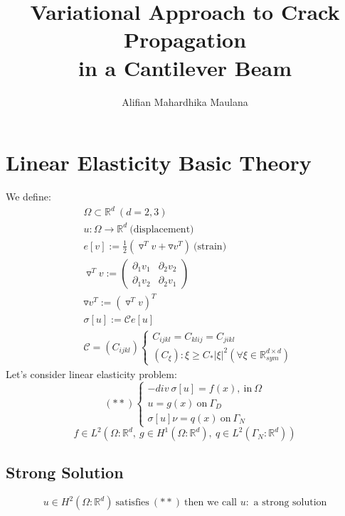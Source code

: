 \documentclass[a4paper,11pt]{article}
\title{Variational Approach to Crack Propagation\\ in a Cantilever Beam}
\author{Alifian Mahardhika Maulana}
\newcommand{\R}{\mathbb{R}}
\newcommand{\Cmod}{\mathcal{C}}
\begin{document}
\maketitle
\section{Linear Elasticity Basic Theory}
We define:
\begin{equation*}
\begin{aligned}
&\Omega \subset \R^d\ (d=2,3)\\
&u:\Omega \rightarrow \R^d\ \text{(displacement)}\\
&e[v]:= \frac{1}{2}(\triangledown^T v + \triangledown v^T)\ \text{(strain)}\\
&\triangledown^T v := \begin{pmatrix}
\partial_1 v_1 & \partial_2 v_2\\
\partial_1 v_2 & \partial_2 v_1
\end{pmatrix}\\
& \triangledown v^T := ( \triangledown^T v)^T\\
&\sigma[u]:=\Cmod e[u]\\
&\Cmod=(C_{ijkl})\begin{cases}
C_{ijkl}=C_{klij}=C_{jikl}\\
(C_\xi):\xi \geq C_* |\xi|^2 (\forall \xi \in \R_{sym}^{d\times d})
\end{cases}
\end{aligned}
\end{equation*}
Let's consider linear elasticity problem:
\begin{equation}\label{eq:stronglinear}
(**)\begin{cases}
-div\ \sigma[u]=f(x),\ \text{in}\ \Omega\\
u=g(x)\ \text{on}\ \Gamma_D\\
\sigma[u] \nu = q(x)\ \text{on}\ \Gamma_N
\end{cases}
\end{equation}
\begin{equation*}
f \in L^2(\Omega : \R^d,\ g\in H^1(\Omega : \R^d),\ q\in L^2(\Gamma_N:\R^d))
\end{equation*}
\subsection{Strong Solution}
\begin{equation}
u\in H^2 (\Omega : \R^d)\ \text{satisfies}\ (**)\ \text{then we call $u:$ a strong solution}
\end{equation}
\end{document}
